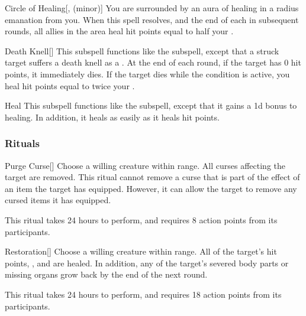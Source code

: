 \begin{ability}[\nth{3}]{Circle of Healing}[,  (minor)]
You are surrounded by an aura of healing in a \areamed radius emanation from you.
When this spell resolves, and the end of each  in subsequent rounds, all allies in the area heal hit points equal to half your .
\end{ability}
\vspace{0.25em}



\begin{ability}[\nth{3}]{Death Knell}[]
This subspell functions like the  subspell, except that a struck target suffers a death knell as a .
At the end of each round, if the target has 0 hit points, it immediately dies.
If the target dies while the condition is active, you heal hit points equal to twice your .
\end{ability}
\vspace{0.25em}



\begin{ability}[\nth{4}]{Heal}
This subspell functions like the  subspell, except that it gains a \plus1d bonus to healing.
In addition, it heals  as easily as it heals hit points.
\end{ability}
\vspace{0.25em}



\subsubsection{Rituals}


\begin{ability}[\nth{2}]{Purge Curse}[]
Choose a willing creature within \rngclose range.
All curses affecting the target are removed.
This ritual cannot remove a curse that is part of the effect of an item the target has equipped.
However, it can allow the target to remove any cursed items it has equipped.

This ritual takes 24 hours to perform, and requires 8 action points from its participants.
\end{ability}
\vspace{0.25em}



\begin{ability}[\nth{3}]{Restoration}[]
Choose a willing creature within \rngclose range.
All of the target's hit points, , and  are healed.
In addition, any of the target's severed body parts or missing organs grow back by the end of the next round.

This ritual takes 24 hours to perform, and requires 18 action points from its participants.
\end{ability}
\vspace{0.25em}



